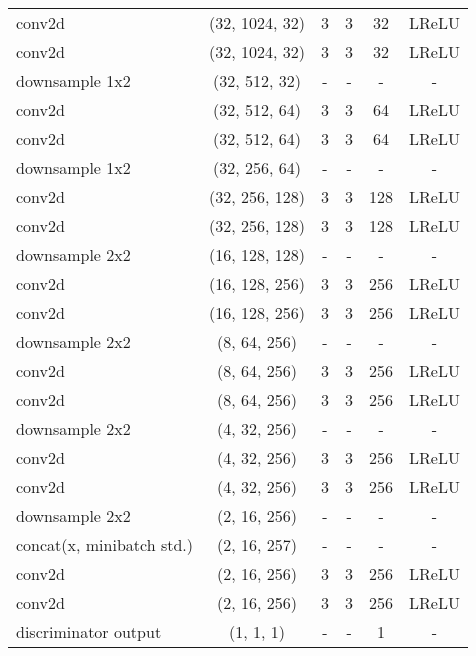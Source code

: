 \begin{table*}[ht!]
\begin{tabular}{l c c c c c}
  conv2d & (32, 1024, 32) & 3 & 3 & 32 & LReLU \\
  conv2d & (32, 1024, 32) & 3 & 3 & 32 & LReLU \\
  downsample 1x2 & (32, 512, 32) & - & - & - & - \\
  conv2d & (32, 512, 64) & 3 & 3 & 64 & LReLU \\
  conv2d & (32, 512, 64) & 3 & 3 & 64 & LReLU \\
  downsample 1x2 & (32, 256, 64) & - & - & - & - \\
  conv2d & (32, 256, 128) & 3 & 3 & 128 & LReLU \\
  conv2d & (32, 256, 128) & 3 & 3 & 128 & LReLU \\
  downsample 2x2 & (16, 128, 128) & - & - & - & - \\
  conv2d & (16, 128, 256) & 3 & 3 & 256 & LReLU \\
  conv2d & (16, 128, 256) & 3 & 3 & 256 & LReLU \\
  downsample 2x2 & (8, 64, 256) & - & - & - & - \\
  conv2d & (8, 64, 256) & 3 & 3 & 256 & LReLU \\
  conv2d & (8, 64, 256) & 3 & 3 & 256 & LReLU \\
  downsample 2x2 & (4, 32, 256) & - & - & - & - \\
  conv2d & (4, 32, 256) & 3 & 3 & 256 & LReLU \\
  conv2d & (4, 32, 256) & 3 & 3 & 256 & LReLU \\
  downsample 2x2 & (2, 16, 256) & - & - & - & - \\
  concat(x, minibatch std.) & (2, 16, 257) & - & - & - & - \\
  conv2d & (2, 16, 256) & 3 & 3 & 256 & LReLU \\
  conv2d & (2, 16, 256) & 3 & 3 & 256 & LReLU \\ \hline
  discriminator output & (1, 1, 1) & - & - & 1 & - \\ 
  \bottomrule
\end{tabular}
\end{table*}